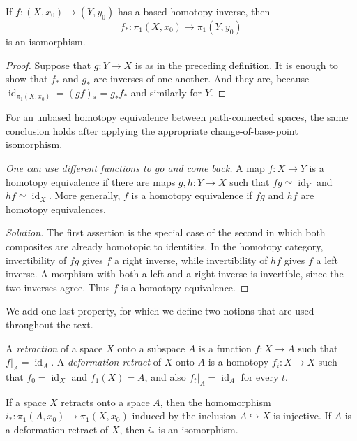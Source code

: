 \begin{corollary}
\label{lemma-based-homotopy-equivalence}
If $f:(X,x_0)\to(Y,y_0)$ has a based
homotopy inverse, then
$$
f_*:\pi_1(X,x_0)\longrightarrow
\pi_1(Y,y_0)
$$
is an isomorphism.
\end{corollary}

\begin{proof}
Suppose that $g:Y\to X$ is as in the
preceding definition.
It is enough to show that $f_*$ and $g_*$ are
inverses of one
another. And they are, because
$\operatorname{id}_{\pi_1(X,x_0)}
=(g f)_*=g_*f_*$ and similarly for $Y$.
\end{proof}

For an unbased homotopy equivalence between
path-connected spaces, the same conclusion
holds after applying the appropriate
change-of-base-point isomorphism.

\begin{exercise}[Hatcher 0.11]
\label{exercise-hatcher-homotopy-equivalence}
\label{hatcher:0.11}
\emph{One can use different functions to go
and come back.} A map $f:X\to Y$ is a
homotopy equivalence if there are maps
$g,h:Y\to X$ such that
$fg\simeq\operatorname{id}_Y$ and
$hf\simeq\operatorname{id}_X$. More
generally,
$f$ is a homotopy equivalence if $fg$ and
$hf$ are homotopy equivalences.
\begin{proof}[Solution]
The first assertion is the special case of
the
second in which both composites are already
homotopic to identities. In the homotopy
category, invertibility of $fg$ gives $f$ a
right inverse, while invertibility of $hf$
gives $f$ a left inverse. A morphism with
both
a left and a right inverse is invertible,
since
the two inverses agree. Thus $f$ is a
homotopy
equivalence.
\end{proof}
\end{exercise}

We add one last property, for which we define
two notions
that are used throughout the text.

\begin{definition}
\label{definition-retraction}
\label{def:retracto}
A \emph{retraction} of a space $X$ onto a
subspace $A$ is a
function $f:X\to A$ such that
$f|_A=\operatorname{id}_A$. A
\emph{deformation retract} of $X$ onto $A$ is
a homotopy
$f_t:X\to X$ such that
$f_0=\operatorname{id}_X$ and
$f_1(X)=A$, and also
$f_t|_A=\operatorname{id}_A$ for every $t$.
\end{definition}

\begin{proposition}
If a space $X$ retracts onto a space $A$,
then the
homomorphism
$i_*:\pi_1(A,x_0)\to\pi_1(X,x_0)$ induced by
the inclusion $A\hookrightarrow X$ is
injective. If $A$ is a
deformation retract of $X$, then $i_*$ is an
isomorphism.
\end{proposition}
